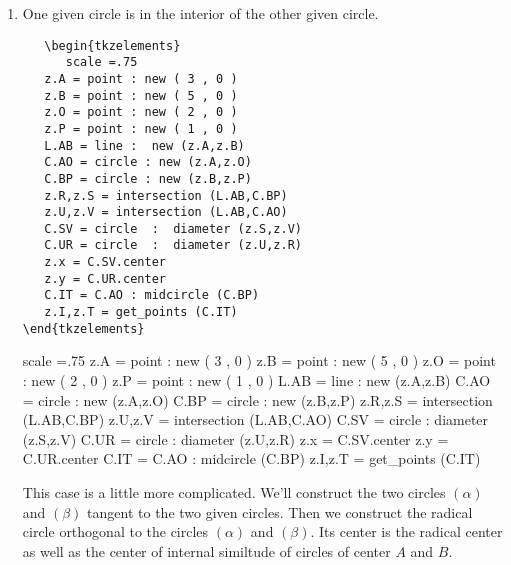\begin{enumerate}[label=(\roman*)]
\vfill

\item  One given circle is in the interior of the other given circle.
\label{midcircle_diameter}
\begin{minipage}{.6\textwidth}
\begin{Verbatim}
   \begin{tkzelements}
      scale =.75  
   z.A = point : new ( 3 , 0 ) 
   z.B = point : new ( 5 , 0 ) 
   z.O = point : new ( 2 , 0 ) 
   z.P = point : new ( 1 , 0 ) 
   L.AB = line :  new (z.A,z.B)
   C.AO = circle : new (z.A,z.O)
   C.BP = circle : new (z.B,z.P)
   z.R,z.S = intersection (L.AB,C.BP)
   z.U,z.V = intersection (L.AB,C.AO) 
   C.SV = circle  :  diameter (z.S,z.V)
   C.UR = circle  :  diameter (z.U,z.R)
   z.x = C.SV.center
   z.y = C.UR.center
   C.IT = C.AO : midcircle (C.BP)
   z.I,z.T = get_points (C.IT) 
\end{tkzelements}
\end{Verbatim}
\end{minipage}
\begin{minipage}{.6\textwidth}
   \begin{tkzelements}
         scale =.75  
      z.A = point : new ( 3 , 0 ) 
      z.B = point : new ( 5 , 0 ) 
      z.O = point : new ( 2 , 0 ) 
      z.P = point : new ( 1 , 0 ) 
      L.AB = line :  new (z.A,z.B)
      C.AO = circle : new (z.A,z.O)
      C.BP = circle : new (z.B,z.P)
      z.R,z.S = intersection (L.AB,C.BP)
      z.U,z.V = intersection (L.AB,C.AO) 
      C.SV = circle  :  diameter (z.S,z.V)
      C.UR = circle  :  diameter (z.U,z.R)
      z.x = C.SV.center
      z.y = C.UR.center
      C.IT = C.AO : midcircle (C.BP)
      z.I,z.T = get_points (C.IT) 
   \end{tkzelements}
   \end{minipage}

This case is a little more complicated. We'll construct the two circles $(\alpha)$ and $(\beta)$ tangent to the two given circles. Then we construct the radical circle orthogonal to the circles $(\alpha)$ and $(\beta)$. Its center is the radical center as well as the center of internal similtude of circles of center $A$ and $B$.


\end{enumerate}
